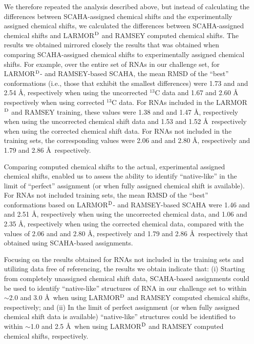 \documentclass[journal=jcisd8,manuscript=article,layout=onecolumn]{achemso}
\begin{document}
We therefore repeated  the analysis described above, but instead of calculating the differences between SCAHA-assigned chemical shifts and the experimentally assigned chemical shifts, we calculated the differences between SCAHA-assigned chemical shifts and LARMOR$^{\rm D}$ and RAMSEY computed chemical shifts. The results we obtained mirrored closely the results that was obtained when comparing SCAHA-assigned chemical shifts to experimentally assigned chemical shifts. For example, over the entire set of RNAs in our challenge set, for LARMOR$^{\rm D}$- and RAMSEY-based SCAHA, the mean RMSD of the ``best'' conformations (i.e., those that exhibit the smallest differences) were 1.73 and  and 2.54 \AA, respectively when using the uncorrected $^{13}$C data and 1.67 and 2.60 \AA\, respectively when using corrected $^{13}$C data. %
For RNAs included in the LARMOR$^{\rm D}$ and RAMSEY training, these values were 1.38 and  and 1.47 \AA, respectively when using the uncorrected chemical shift data and 1.53 and 1.52 \AA\, respectively when using the corrected chemical shift data. For RNAs not included in the training sets, the corresponding values were 2.06 and  and 2.80 \AA, respectively and 1.79 and 2.86 \AA\, respectively. 

Comparing computed chemical shifts to the actual, experimental assigned chemical shifts, enabled us to assess the ability to identify ``native-like'' in the limit of ``perfect'' assignment (or when fully assigned chemical shift is available). For RNAs not included training sets, the mean RMSD of the ``best'' conformations based on LARMOR$^{\rm D}$- and RAMSEY-based SCAHA were 1.46 and  and 2.51 \AA, respectively when using the uncorrected chemical data, and 1.06 and 2.35 \AA, respectively when using the corrected chemical data, compared with the values of 2.06 and  and 2.80 \AA, respectively and 1.79 and 2.86 \AA\, respectively that obtained using SCAHA-based assignments. 

Focusing on the results obtained for RNAs not included in the training sets and utilizing data free of referencing, the results we obtain indicate that: (i) Starting from completely unassigned chemical shift data, SCAHA-based assignments could be used to identify  ``native-like'' structures of RNA in our challenge set to within $\sim$2.0 and 3.0 \AA\ when using LARMOR$^{\rm D}$ and RAMSEY computed chemical shifts, respectively;  and (ii) In the limit of perfect assignment (or when fully assigned chemical shift data is available) ``native-like''  structures could be identified to within $\sim$1.0 and 2.5 \AA\ when using LARMOR$^{\rm D}$ and RAMSEY computed chemical shifts, respectively.
\end{document}
